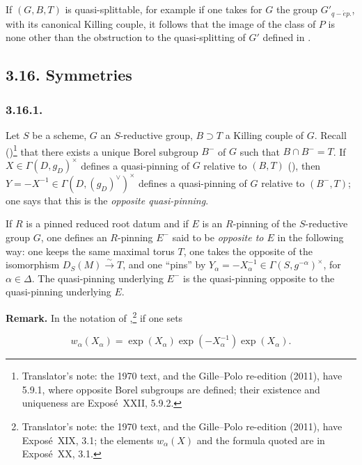 If \((G, B, T)\) is quasi-splittable, for example if one takes for \(G\) the group \(G'_{q-\acute{e}p.}\), with its canonical
Killing couple, it follows that the image of the class of \(P\) is none other than the obstruction to the quasi-splitting
of \(G'\) defined in .

\subsection*{3.16. Symmetries}

\subsubsection*{3.16.1.}

Let \(S\) be a scheme, \(G\) an \(S\)-reductive group, \(B \supset T\) a Killing couple of \(G\). Recall ()\footnote{Translator's note: the 1970 text, and the Gille--Polo re-edition (2011),
have 5.9.1, where opposite Borel subgroups are defined; their existence and uniqueness are
Exposé~XXII, 5.9.2.} that there exists a unique Borel subgroup \(B^{-}\) of \(G\) such that \(B \cap B^{-} = T\). If \(X \in \Gamma(D,
g_{D})^{\times}\) defines a quasi-pinning of \(G\) relative to \((B, T)\) (), then \(Y = -X^{-1} \in \Gamma(D,
(g_{D})^{\vee})^{\times}\) defines a quasi-pinning of \(G\) relative to \((B^{-}, T)\); one says that this is the \emph{opposite
quasi-pinning}.

If \(R\) is a pinned reduced root datum and if \(E\) is an \(R\)-pinning of the \(S\)-reductive group \(G\), one defines an
\(R\)-pinning \(E^{-}\) said to be \emph{opposite to \(E\)} in the following way: one keeps the same maximal torus \(T\), one takes
the opposite of the isomorphism \(D_{S}(M) \xrightarrow{\sim} T\), and one ``pins'' by \(Y_{\alpha} = -X^{-1}_{\alpha} \in
\Gamma(S, g^{-\alpha})^{\times}\), for \(\alpha \in \Delta\). The quasi-pinning underlying \(E^{-}\) is the quasi-pinning
opposite to the quasi-pinning underlying \(E\).

\textbf{Remark.} In the notation of ,\footnote{Translator's
note: the 1970 text, and the Gille--Polo re-edition (2011), have Exposé~XIX, 3.1; the elements
\(w_\alpha(X)\) and the formula quoted are in Exposé~XX, 3.1.} if one sets

\[
  w_\alpha(X_\alpha)
  =\exp(X_\alpha)\exp(-X_\alpha^{-1})\exp(X_\alpha).
\]

